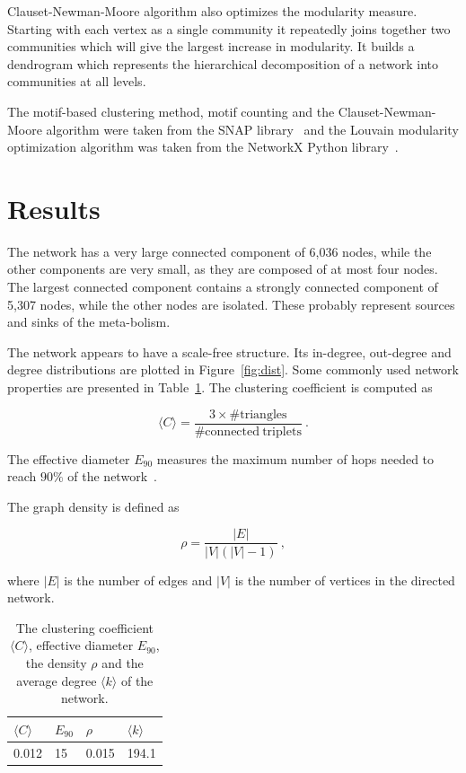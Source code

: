 Clauset-Newman-Moore algorithm also optimizes the modularity measure. Starting with each vertex
as a single community it repeatedly joins together two communities which will give the largest
increase in modularity. It builds a dendrogram which represents the hierarchical decomposition
of a network into communities at all levels.

The motif-based clustering method, motif counting and the Clauset-Newman-Moore
algorithm were taken from the SNAP library~\cite{leskovec2016snap} and the
Louvain modularity optimization algorithm was taken from the NetworkX Python
library~\cite{networkx}.

\section{Results}
\label{sec:results}

The network has a very large connected component of 6,036 nodes, while the other
components are very small, as they are composed of at most four nodes. The
largest connected component contains a strongly connected component of 5,307
nodes, while the other nodes are isolated. These probably represent sources and
sinks of the meta-bolism.

The network appears to have a scale-free structure. Its in-degree, out-degree
and degree distributions are plotted in Figure~\ref{fig:dist}. Some commonly
used network properties are presented in Table~\ref{tab:metrics}. The clustering
coefficient is computed as

\begin{equation}
  \langle C \rangle = \frac{3 \times \mathrm{\# triangles}}{\mathrm{\# connected
  \ triplets}}\ .
\end{equation}

The effective diameter $E_{90}$ measures the maximum number of hops needed to
reach $90\%$ of the network~\cite{leskovec2007graph}.

The graph density is defined as

\begin{equation}
  \rho = \frac{|E|}{|V|(|V| - 1)}\ ,
\end{equation}

\noindent
where $|E|$ is the number of edges and $|V|$ is the number of vertices in the
directed network.

\begin{table}
  \centering
  \begin{tabular}{l|l|l|l}
    $\langle C \rangle$ & $E_{90}$ & $\rho$ & $\langle k \rangle$ \\ \hline
    0.012 & 15 & 0.015 & 194.1
  \end{tabular}
  \caption{The clustering coefficient $\langle C\rangle$, effective diameter
    $E_{90}$, the density $\rho$ and the average degree $\langle k \rangle$ of
    the network.}
  \label{tab:metrics}
\end{table}

